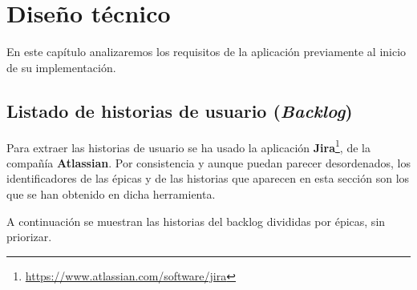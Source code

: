 \chapter{Diseño técnico}

En este capítulo analizaremos los requisitos de la aplicación previamente al inicio de su implementación.

\section{Listado de historias de usuario (\textit{Backlog})}



Para extraer las historias de usuario se ha usado la aplicación \textbf{Jira}\footnote{\url{https://www.atlassian.com/software/jira}}, de la compañía \textbf{Atlassian}. Por consistencia y aunque puedan parecer desordenados, los identificadores de las épicas y de las historias que aparecen en esta sección son los que se han obtenido en dicha herramienta.

A continuación se muestran las historias del backlog divididas por épicas, sin priorizar.


